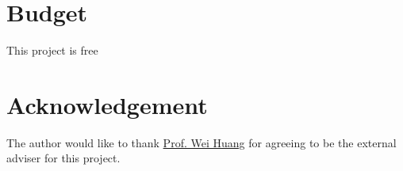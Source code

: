 \documentclass[a4paper, 11pt]{article}
\begin{document}
\section{Budget}
This project is free
\section*{Acknowledgement}
The author would like to thank \href{mailto:wei.huang@eng.ox.ac.uk}{Prof. Wei Huang} for agreeing to be the external adviser for this project.
\clearpage
\nocite{*}\printbibliography
\end{document}
